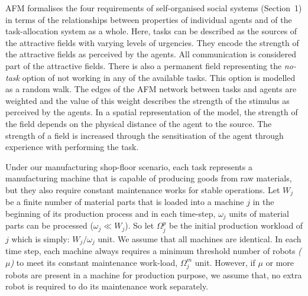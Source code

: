 \documentclass[journal]{IEEEtran}
\begin{document}
AFM formalises the four requirements of self-organised social systems (Section~1) in terms of the relationships between properties of individual agents and of the task-allocation system as a whole. Here, tasks can be described as the sources of the attractive fields with varying levels of urgencies. They encode the strength of the attractive fields as perceived by the agents. All communication is considered part of the attractive fields. There is also a permanent field representing the {\em no-task} option of not working in any of the available tasks. This option is modelled as a random walk. The edges of the AFM network  between tasks and agents are weighted and the value of this weight describes the strength of the stimulus as perceived by the agents. In a spatial representation of the model, the strength of the field depends on the physical distance of the agent to the source.  The strength of a field is increased through the sensitisation of the agent through experience with performing the task.
 
Under our manufacturing shop-floor scenario, each task represents a manufacturing machine that is capable of producing goods from raw materials, but they also require constant maintenance works for stable operations. 
Let $W_{j}$ be a finite number of material parts that is loaded into a machine $j$ in the beginning of its production process and in each time-step, $\omega_{j}$ units of material parts can be processed ($\omega_{j} \ll W_{j} $). So let $\Omega_{j}^{p}$ be the initial production workload of $j$ which is simply: $W_{j} / \omega_{j}$ unit. We assume that all machines are identical. In each time step, each machine always requires a minimum threshold number of robots {\em ($\mu$)} to meet its constant maintenance work-load, $\Omega_{j}^{m}$ unit. However, if $\mu$ or more robots are present in a machine for production purpose, we assume that, no extra robot is required to do its maintenance work separately. 
 
\end{document}
